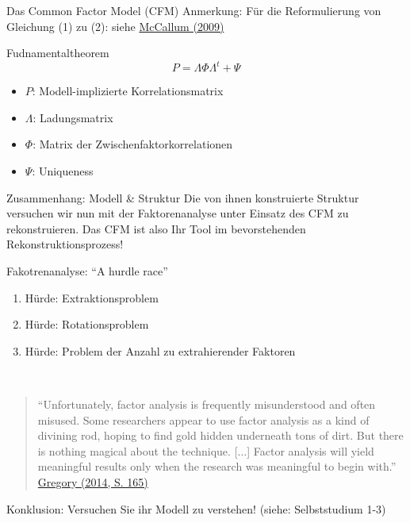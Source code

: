 \documentclass[
  ignorenonframetext,
]{beamer}
\providecommand{\tightlist}{%
  \setlength{\itemsep}{0pt}\setlength{\parskip}{0pt}}
\begin{document}
\begin{frame}{Das Common Factor Model (CFM)}
\protect\hypertarget{das-common-factor-model-cfm}{}
Anmerkung: Für die Reformulierung von Gleichung (1) zu (2): siehe
\href{http://dx.doi.org/10.4135/9780857020994.n6}{McCallum (2009)}

\begin{alertblock}{Fudnamentaltheorem}
  \begin{equation}
    P = \Lambda \Phi \Lambda^{t} + \Psi
  \end{equation}
\end{alertblock}

\begin{itemize}
\tightlist
\item
  \(P\): Modell-implizierte Korrelationsmatrix
\item
  \(\Lambda\): Ladungsmatrix
\item
  \(\Phi\): Matrix der Zwischenfaktorkorrelationen
\item
  \(\Psi\): Uniqueness
\end{itemize}

\begin{block}{Zusammenhang: Modell \& Struktur}
Die von ihnen konstruierte Struktur versuchen wir nun mit der Faktorenanalyse
unter Einsatz des CFM zu rekonstruieren. Das CFM ist also Ihr Tool im
bevorstehenden Rekonstruktionsprozess!
\end{block}
\end{frame}

\begin{frame}{Fakotrenanalyse: ``A hurdle race''}
\protect\hypertarget{fakotrenanalyse-a-hurdle-race}{}
\begin{enumerate}
\tightlist
\item
  Hürde: Extraktionsproblem
\item
  Hürde: Rotationsproblem
\item
  Hürde: Problem der Anzahl zu extrahierender Faktoren
\end{enumerate}

~

\begin{quote}
``Unfortunately, factor analysis is frequently misunderstood and often
misused. Some researchers appear to use factor analysis as a kind of
divining rod, hoping to find gold hidden underneath tons of dirt. But
there is nothing magical about the technique. {[}\(\dots\){]} Factor
analysis will yield meaningful results only when the research was
meaningful to begin with.''
\href{https://www.pearson.com/us/higher-education/program/Gregory-Psychological-Testing-History-Principles-and-Applications-7th-Edition/PGM332874.html}{Gregory
(2014, S. 165)}
\end{quote}

Konklusion: Versuchen Sie ihr Modell zu verstehen! (siehe: Selbststudium
1-3)
\end{frame}
\end{document}
